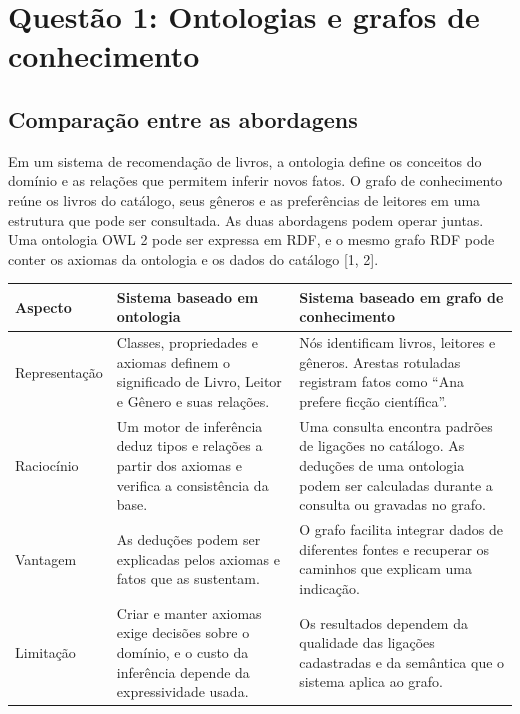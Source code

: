\documentclass[12pt,a4paper]{article}
\begin{document}
\section{Questão 1: Ontologias e grafos de conhecimento}

\subsection{Comparação entre as abordagens}

Em um sistema de recomendação de livros, a ontologia define os conceitos do domínio e as relações que permitem inferir novos fatos. O grafo de conhecimento reúne os livros do catálogo, seus gêneros e as preferências de leitores em uma estrutura que pode ser consultada. As duas abordagens podem operar juntas. Uma ontologia OWL 2 pode ser expressa em RDF, e o mesmo grafo RDF pode conter os axiomas da ontologia e os dados do catálogo [1, 2].

\begin{table}[htbp]
    \centering
    \begin{tabular}{>{\raggedright\arraybackslash}p{2.7cm} >{\raggedright\arraybackslash}p{5.8cm} >{\raggedright\arraybackslash}p{6.0cm}}
        \toprule
        \textbf{Aspecto} & \textbf{Sistema baseado em ontologia} & \textbf{Sistema baseado em grafo de conhecimento} \\
        \midrule
        Representação & Classes, propriedades e axiomas definem o significado de Livro, Leitor e Gênero e suas relações. & Nós identificam livros, leitores e gêneros. Arestas rotuladas registram fatos como ``Ana prefere ficção científica''. \\
        \addlinespace
        Raciocínio & Um motor de inferência deduz tipos e relações a partir dos axiomas e verifica a consistência da base. & Uma consulta encontra padrões de ligações no catálogo. As deduções de uma ontologia podem ser calculadas durante a consulta ou gravadas no grafo. \\
        \addlinespace
        Vantagem & As deduções podem ser explicadas pelos axiomas e fatos que as sustentam. & O grafo facilita integrar dados de diferentes fontes e recuperar os caminhos que explicam uma indicação. \\
        \addlinespace
        Limitação & Criar e manter axiomas exige decisões sobre o domínio, e o custo da inferência depende da expressividade usada. & Os resultados dependem da qualidade das ligações cadastradas e da semântica que o sistema aplica ao grafo. \\
        \bottomrule
    \end{tabular}
\end{table}
\end{document}
